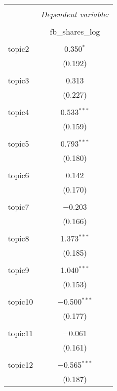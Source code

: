 
\begin{table}[!htbp] \centering 
  \caption{} 
  \label{} 
  \begin{adjustbox}{totalheight=\baselineskip}
\begin{tabular}{@{\extracolsep{5pt}}lc} 
\\[-1.8ex]\hline 
\hline \\[-1.8ex] 
 & \multicolumn{1}{c}{\textit{Dependent variable:}} \\ 
\cline{2-2} 
\\[-1.8ex] & fb\_shares\_log \\ 
\hline \\[-1.8ex] 
 topic2 & 0.350$^{*}$ \\ 
  & (0.192) \\ 
  & \\ 
 topic3 & 0.313 \\ 
  & (0.227) \\ 
  & \\ 
 topic4 & 0.533$^{***}$ \\ 
  & (0.159) \\ 
  & \\ 
 topic5 & 0.793$^{***}$ \\ 
  & (0.180) \\ 
  & \\ 
 topic6 & 0.142 \\ 
  & (0.170) \\ 
  & \\ 
 topic7 & $-$0.203 \\ 
  & (0.166) \\ 
  & \\ 
 topic8 & 1.373$^{***}$ \\ 
  & (0.185) \\ 
  & \\ 
 topic9 & 1.040$^{***}$ \\ 
  & (0.153) \\ 
  & \\ 
 topic10 & $-$0.500$^{***}$ \\ 
  & (0.177) \\ 
  & \\ 
 topic11 & $-$0.061 \\ 
  & (0.161) \\ 
  & \\ 
 topic12 & $-$0.565$^{***}$ \\ 
  & (0.187) \\ 

\end{tabular}
\end{adjustbox}
\end{table}
